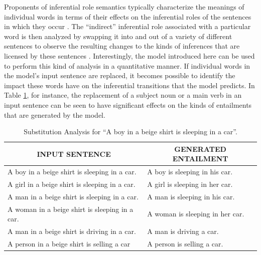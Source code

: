 Proponents of inferential role semantics typically characterize the meanings of individual words in terms of their effects on the inferential roles of the sentences in which they occur \citep{Brandom:1994,Brandom:2000,Block:1986}. The ``indirect'' inferential role associated with a particular word is then analyzed by swapping it into and out of a variety of different sentences to observe the resulting changes to the kinds of inferences that are licensed by these sentences \citep{Brandom:1994}. Interestingly, the model introduced here can be used to perform this kind of analysis in a quantitative manner. If individual words in the model's input sentence are replaced, it becomes possible to identify the impact these words have on the inferential transitions that the model predicts. In Table \ref{tab:sub}, for instance, the replacement of a subject noun or a main verb in an input sentence can be seen to have significant effects on the kinds of entailments that are generated by the model. 

\begin{table}[!t]
\begin{center} 

\caption{Substitution Analysis for ``A boy in a beige shirt is sleeping in a car''.} 

\label{tab:sub}
\vskip 0.06in
\setlength{\tabcolsep}{12pt}
\begin{tabular}{ll} 
\hline

\multicolumn{1}{c}{\rule{0pt}{3ex} INPUT SENTENCE} & 
\multicolumn{1}{c}{GENERATED ENTAILMENT} \\

\hline
\rule{0pt}{3ex}A boy in a beige shirt is sleeping in a car. & A boy is sleeping in his car. \\
A girl in a beige shirt is sleeping in a car. & A girl is sleeping in her car. \\
A man in a beige shirt is sleeping in a car. & A man is sleeping in his car. \\
A woman in a beige shirt is sleeping in a car. & A woman is sleeping in her car. \\
A man in a beige shirt is driving in a car. & A man is driving a car. \\
A person in a beige shirt is selling a car & A person is selling a car. \\
\hline
\end{tabular}
\end{center} 
\end{table}

